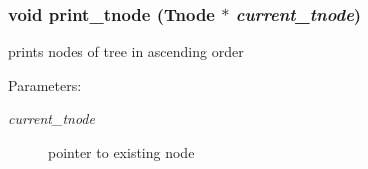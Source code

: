 \subsubsection{\setlength{\rightskip}{0pt plus 5cm}void print\_\-tnode (\bf{Tnode} $\ast$ {\em current\_\-tnode})}\label{tree_8h_a29be39c138fe7565f6b20455b8ba6ac}


prints nodes of tree in ascending order \begin{Desc}
\item[Parameters:]
\begin{description}
\item[{\em current\_\-tnode}]pointer to existing node \end{description}
\end{Desc}
